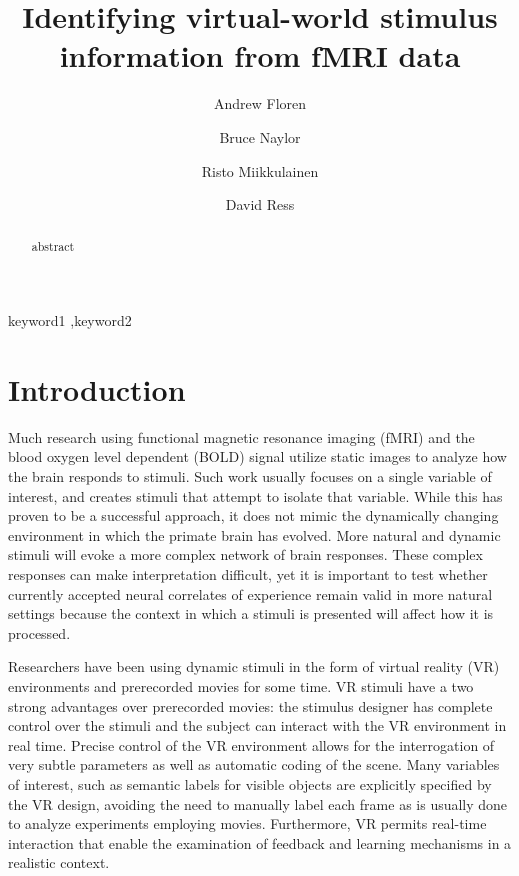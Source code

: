 \documentclass[preprint,5p,authoryear]{elsarticle}
\begin{document}
\begin{frontmatter}

\title{Identifying virtual-world stimulus information from fMRI data}

\author[UT]{Andrew Floren}

\author[UT]{Bruce Naylor}

\author[UT]{Risto Miikkulainen}

\author[UT]{David Ress}

\address[UT]{The University of Texas at Austin, Austin, TX 78712 USA}


\begin{abstract}
abstract
\end{abstract}

\begin{keyword}
keyword1 \sep keyword2
\end{keyword}

\end{frontmatter}

\section{Introduction}
Much research using functional magnetic resonance imaging (fMRI) and the blood oxygen level dependent (BOLD) signal utilize static images to analyze how the brain responds to stimuli.
Such work usually focuses on a single variable of interest, and creates stimuli that attempt to isolate that variable.
While this has proven to be a successful approach, it does not mimic the dynamically changing environment in which the primate brain has evolved.
More natural and dynamic stimuli will evoke a more complex network of brain responses.
These complex responses can make interpretation difficult, yet it is important to test whether currently accepted neural correlates of experience remain valid in more natural settings because the context in which a stimuli is presented will affect how it is processed.

Researchers have been using dynamic stimuli in the form of virtual reality (VR) environments \citep{Maguire1998,Calhoun2002,King2006,Mathiak2006,Spiers2007a,Hassabis2009} and prerecorded movies \citep{Hasson2004,Chadwick2010,Nishimoto2011} for some time.
VR stimuli have a two strong advantages over prerecorded movies: the stimulus designer has complete control over the stimuli and the subject can interact with the VR environment in real time.
Precise control of the VR environment allows for the interrogation of very subtle parameters as well as automatic coding of the scene.
Many variables of interest, such as semantic labels for visible objects are explicitly specified by the VR design, avoiding the need to manually label each frame as is usually done to analyze experiments employing movies.
Furthermore, VR permits real-time interaction that enable the examination of feedback and learning mechanisms in a realistic context.
\end{document}
